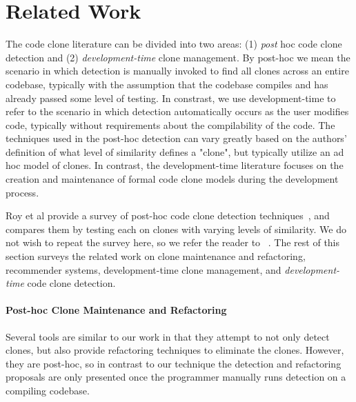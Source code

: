 \documentclass[preprint,10pt]{sigplanconf}
\begin{document}
\section{Related Work}
\label{sec:related}

The code clone literature can be divided into two areas: (1)
\emph{post} hoc code clone detection and
(2) \emph{development-time} clone management. By post-hoc we mean the scenario in which
detection is manually invoked to find all clones across an entire codebase, typically with the assumption that the codebase compiles and has already passed some level of testing.  In constrast, we use development-time to refer to the scenario in which detection automatically occurs as the user modifies code, typically without requirements about the compilability of the code.  The techniques used in the
post-hoc detection can vary greatly  based on the authors' definition of what 
level of similarity defines a "clone", but typically utilize an
ad hoc model of clones. In contrast, the development-time literature focuses on
the creation and maintenance of formal code clone models during the
development process.

Roy et al provide a survey of post-hoc code clone detection
techniques~\cite{Roy2009}, and compares them by testing 
each on clones with varying levels of similarity. We do not wish 
to repeat the survey here, so we refer the reader to ~\cite{Roy2009}.
The rest of this section surveys the
related work on clone maintenance and refactoring, recommender systems,
development-time clone management, and \emph{development-time} code clone detection.

\paragraph{Post-hoc Clone Maintenance and Refactoring}


Several tools are similar to our work in that they attempt to not only
detect clones, but also provide refactoring techniques to eliminate the clones.  However,
they are post-hoc, so in contrast to our technique
 the detection and refactoring proposals are only presented once the 
programmer manually runs detection on a compiling codebase.
\end{document}
